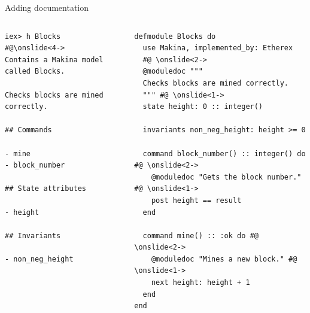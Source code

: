 \documentclass[aspectratio=169, 10pt]{beamer}
\begin{document}
\begin{frame}[label={sec:org6856c6c},fragile]{Adding documentation}
 \begin{columns}
\begin{column}{0.52\columnwidth}
\lstset{language=bash,label= ,caption= ,captionpos=b,numbers=none,style=shell}
\begin{lstlisting}
iex> h Blocks
#@\onslide<4->
Contains a Makina model called Blocks.

Checks blocks are mined correctly.

## Commands

- mine
- block_number

## State attributes

- height

## Invariants

- non_neg_height
\end{lstlisting}
\end{column}

\begin{column}{0.44\columnwidth}
\lstset{language=elixir,label= ,caption= ,captionpos=b,numbers=none,style=display}
\begin{lstlisting}
defmodule Blocks do
  use Makina, implemented_by: Etherex
  #@ \onslide<2->
  @moduledoc """
  Checks blocks are mined correctly.
  """ #@ \onslide<1->
  state height: 0 :: integer()

  invariants non_neg_height: height >= 0

  command block_number() :: integer() do #@ \onslide<2->
    @moduledoc "Gets the block number." #@ \onslide<1->
    post height == result
  end

  command mine() :: :ok do #@ \onslide<2->
    @moduledoc "Mines a new block." #@ \onslide<1->
    next height: height + 1
  end
end
\end{lstlisting}
\end{column}
\end{columns}
\end{frame}
\end{document}
